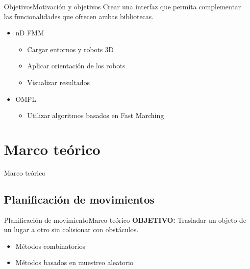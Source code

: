 \documentclass[10pt]{beamer}
\begin{document}
\begin{frame}{Objetivos}{Motivación y objetivos}
Crear una interfaz que permita complementar las funcionalidades que ofrecen ambas bibliotecas.
\vspace{0.3cm}
\begin{itemize}
	\item nD FMM
		\begin{itemize}
			\item Cargar entornos y robots 3D
			\item Aplicar orientación de los robots
			\item Visualizar resultados
		\end{itemize}
		\vspace{0.3cm}
	\item OMPL
		\begin{itemize}
			\item Utilizar algoritmos basados en Fast Marching
		\end{itemize}
\end{itemize}
\end{frame}

\section{Marco teórico}

\begin{frame}
\begin{center}
\vspace{1.5cm}
\huge Marco teórico
\end{center}
\end{frame}


\subsection{Planificación de movimientos}

\begin{frame}{Planificación de movimiento}{Marco teórico}
	\textbf{OBJETIVO:} Trasladar un objeto de un lugar a otro sin colisionar con obstáculos.
	
	\begin{itemize}
		\item Métodos combinatorios		
		\item Métodos basados en muestreo aleatorio
		
	\end{itemize}		
\end{frame}
\end{document}
